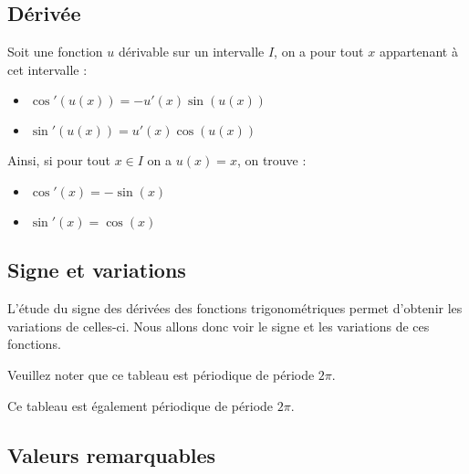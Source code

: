 	\subsection{Dérivée}

	\begin{formula}
		Soit une fonction $u$ dérivable sur un intervalle $I$, on a pour tout $x$ appartenant à cet intervalle :
		\begin{itemize}
			\item $\cos'(u(x)) = -u'(x)\sin(u(x))$
			\item $\sin'(u(x)) = u'(x)\cos(u(x))$
		\end{itemize}
	\end{formula}

	\begin{formula}[Dérivée]
		Ainsi, si pour tout $x \in I$ on a $u(x) = x$, on trouve :
		\begin{itemize}
			\item $\cos'(x) = -\sin(x)$
			\item $\sin'(x) = \cos(x)$
		\end{itemize}
	\end{formula}

	\subsection{Signe et variations}

	L'étude du signe des dérivées des fonctions trigonométriques permet d'obtenir les variations de celles-ci. Nous allons donc voir le signe et les variations de ces fonctions.

	\begin{formula}
		\contentwidth[big]

		Veuillez noter que ce tableau est périodique de période $2\pi$.
	\end{formula}

	\begin{formula}
		\contentwidth[big]

		Ce tableau est également périodique de période $2\pi$.
	\end{formula}

	\subsection{Valeurs remarquables}

